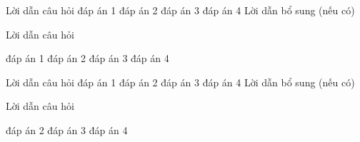 

\begin{ex}%
Lời dẫn câu hỏi
\choice   %
{ đáp án 1}               %
{ đáp án 2}               %
{\True đáp án 3}         %
{ đáp án 4}               %
Lời dẫn bổ sung (nếu có)
\end{ex}

\begin{ex}%
[XX.Y] %
Lời dẫn câu hỏi
\begin{center}
    \begin{tikzpicture}
    \end{tikzpicture}
\end{center}
\choice
{ đáp án 1}
{ đáp án 2}
{\True đáp án 3}
{ đáp án 4}
\end{ex}

\begin{ex}%
[XX.Y] %
{\begin{tikzpicture}
\end{tikzpicture}}
\end{ex}


\begin{ex}%
Lời dẫn câu hỏi
\choiceTF   %
{\True đáp án 1}         %
{ đáp án 2}              %
{\True đáp án 3}         %
{ đáp án 4}              %
Lời dẫn bổ sung (nếu có)
\end{ex}

\begin{ex}%
[XX.Y] %
Lời dẫn câu hỏi
\begin{center}
    \begin{tikzpicture}
    \end{tikzpicture}
\end{center}
{ đáp án 2}
{\True đáp án 3}
{ đáp án 4}
\end{ex}

